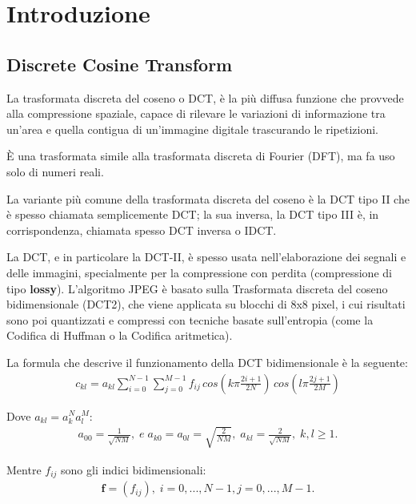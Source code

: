 \documentclass[preprint,12pt]{elsarticle}
\begin{document}
\newpage

\section*{Introduzione}
\subsection*{Discrete Cosine Transform}
La trasformata discreta del coseno o DCT, è la più diffusa funzione che provvede alla compressione spaziale, capace di rilevare le variazioni di informazione tra un'area e quella contigua di un'immagine digitale trascurando le ripetizioni.

È una trasformata simile alla trasformata discreta di Fourier (DFT), ma fa uso solo di numeri reali.

La variante più comune della trasformata discreta del coseno è la DCT tipo II che è spesso chiamata semplicemente DCT; la sua inversa, la DCT tipo III è, in corrispondenza, chiamata spesso DCT inversa o IDCT. 

La DCT, e in particolare la DCT-II, è spesso usata nell'elaborazione dei segnali e delle immagini, specialmente per la compressione con perdita (compressione di tipo \textbf{lossy}). L'algoritmo JPEG è basato sulla Trasformata discreta del coseno bidimensionale (DCT2), che viene applicata su blocchi di 8x8 pixel, i cui risultati sono poi quantizzati e compressi con tecniche basate sull'entropia (come la Codifica di Huffman o la Codifica aritmetica).

\bigskip
La formula che descrive il funzionamento della DCT bidimensionale è la seguente:
\begin{eqnarray*}
c_{kl} = a_{kl} \sum_{i=0}^{N-1} \sum_{j=0}^{M-1} f_{ij} \,  cos\left(k\pi \frac{2i+1}{2N}\right) \, cos\left(l\pi \frac{2j+1}{2M}\right)
\end{eqnarray*}

Dove $a_{kl} = a_{k}^{N} a_{l}^{M}$:
\begin{eqnarray*}
a_{00} = \frac{1}{\sqrt{NM}},\; e \; a_{k0} = a_{0l} = \sqrt{\frac{2}{NM}},\; a_{kl} = \frac{2}{\sqrt{NM}}, \; k, l \geq 1.
\end{eqnarray*}

Mentre $f_{ij}$ sono gli indici bidimensionali:
\begin{eqnarray*}
\textbf{f} = (f_{ij}), \; i=0, ..., N-1, j=0, ..., M-1.
\end{eqnarray*}

\newpage 
\end{document}
